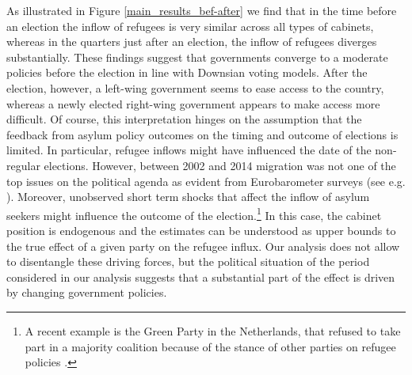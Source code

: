 \documentclass[a4paper,12pt]{article}
\begin{document}
As illustrated in Figure \ref{main_results_bef-after} we find that in the time before an election the inflow of refugees is very similar across all types of cabinets, whereas in the quarters just after an election, the inflow of refugees diverges substantially. These findings suggest that governments converge to a moderate policies before the election in line with Downsian voting models. After the election, however, a left-wing government seems to ease access to the country, whereas a newly elected right-wing government appears to make access more difficult. Of course, this interpretation hinges on the assumption that the feedback from asylum policy outcomes on the timing and outcome of elections is limited. In particular, refugee inflows might have influenced the date of the non-regular elections. However, between 2002 and 2014 migration was not one of the top issues on the political agenda as evident from Eurobarometer surveys (see e.g. \citet{hatton2017}). Moreover, unobserved short term shocks that affect the inflow of asylum seekers might influence the outcome of the election.\footnote{A recent example is the Green Party in the Netherlands, that refused to take part in a majority coalition because of the stance of other parties on refugee policies \textit{\citep{Economist2017}}.} In this case, the cabinet position is endogenous and the estimates can be understood as upper bounds to the true effect of a given party on the refugee influx. Our analysis does not allow to disentangle these driving forces, but the political situation of the period considered in our analysis suggests that a substantial part of the effect is driven by changing government policies.

 
\end{document}
